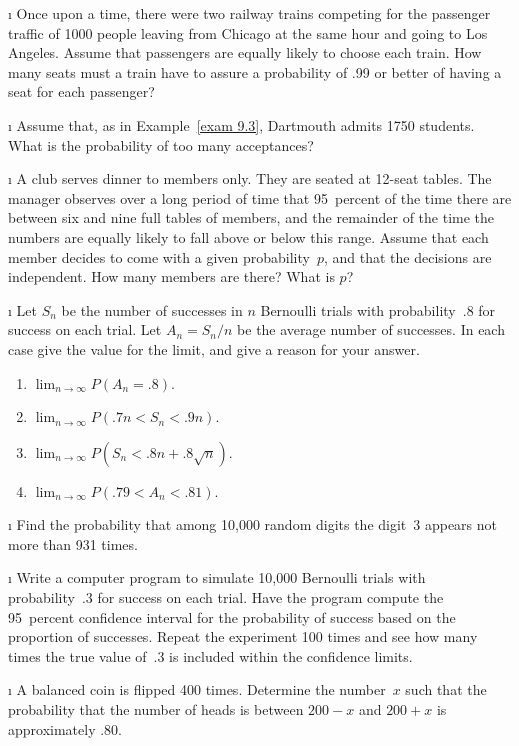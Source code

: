 \begin{LJSItem}
\i\label{exer 9.1.6}  Once upon a time, there were two railway trains competing for the
passenger traffic of 1000 people leaving from Chicago at the same hour and
going to Los Angeles.  Assume that passengers are equally likely to choose each
train.  How many seats must a train have to assure a probability of .99 or
better of having a seat for each passenger?

\i\label{exer 9.1.7}  Assume that, as in Example~\ref{exam 9.3}, Dartmouth admits 1750
students.  What is the probability of too many acceptances?

\i\label{exer 9.1.8}  A club serves dinner to members only.  They are seated at 12-seat
tables.  The manager observes over a long period of time that 95~percent of the
time there are between six and nine full tables of members, and the remainder
of the time the numbers are equally likely to fall above or below this range. 
Assume that each member decides to come with a given probability~$p$, and that
the decisions are independent.  How many members are there?  What is $p$?

\i\label{exer 9.1.9}  Let $S_n$ be the number of successes in $n$ Bernoulli trials with
probability~.8 for success on each trial.  Let $A_n = S_n/n$ be the average number of successes. 
In each case give the value for the limit, and give a reason for your answer.
\begin{enumerate}
\item  $\lim_{n \to \infty} P(A_n = .8)$.

\item  $\lim_{n \to \infty} P(.7n < S_n < .9n)$.

\item  $\lim_{n \to \infty} P(S_n < .8n + .8\sqrt n)$.

\item  $\lim_{n \to \infty} P(.79 < A_n < .81)$.
\end{enumerate}

\i\label{exer 9.1.10}  Find the probability that among 10{,}000 random digits the digit~3
appears not more than 931 times.

\i\label{exer 9.1.11} Write a computer program to simulate 10{,}000
Bernoulli trials with probability~.3 for success on each trial.  Have the
program compute the 95~percent confidence interval for the probability of
success based on the proportion of successes.  Repeat the experiment 100 times
and see how many times the true value of~.3 is included within the confidence
limits.

\i\label{exer 9.1.12}  A balanced coin is flipped 400 times.  Determine the number~$x$ such that
the probability that the number of heads is between $200 - x$ and $200 + x$ is
approximately .80.


\end{LJSItem}
